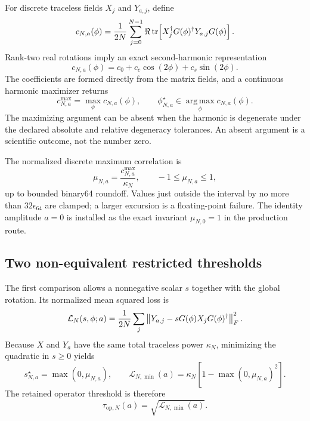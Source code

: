For discrete traceless fields $X_j$ and $Y_{a,j}$, define
\begin{equation}
 c_{N,a}(\phi)
 =\frac{1}{2N}\sum_{j=0}^{N-1}
 \Re\operatorname{tr}\!\left[X_j^\dagger G(\phi)^\dagger
                  Y_{a,j}G(\phi)\right].
 \label{eq:operator-correlation}
\end{equation}
Rank-two real rotations imply an exact second-harmonic representation
\begin{equation}
 c_{N,a}(\phi)=c_0+c_c\cos(2\phi)+c_s\sin(2\phi).
 \label{eq:correlation-harmonic}
\end{equation}
The coefficients are formed directly from the matrix fields, and a continuous harmonic
maximizer returns
\begin{equation}
 c_{N,a}^{\max}=\max_\phi c_{N,a}(\phi),
 \qquad
 \phi_{N,a}^{\star}\in\operatorname*{arg\,max}_\phi c_{N,a}(\phi).
 \label{eq:harmonic-maximum}
\end{equation}
The maximizing argument can be absent when the harmonic is degenerate under the declared
absolute and relative degeneracy tolerances.  An absent argument is a scientific
outcome, not the number zero.

The normalized discrete maximum correlation is
\begin{equation}
 \mu_{N,a}=\frac{c_{N,a}^{\max}}{\kappa_N},
 \qquad -1\le\mu_{N,a}\le1,
 \label{eq:normalized-correlation}
\end{equation}
up to bounded binary64 roundoff.  Values just outside the interval by no more than
$32\epsilon_{64}$ are clamped; a larger excursion is a floating-point failure.  The
identity amplitude $a=0$ is installed as the exact invariant $\mu_{N,0}=1$ in the
production route.

\subsection{Two non-equivalent restricted thresholds}

The first comparison allows a nonnegative scalar $s$ together with the global rotation.
Its normalized mean squared loss is
\begin{equation}
 \mathcal L_N(s,\phi;a)
 =\frac{1}{2N}\sum_j
  \left\lVert Y_{a,j}-sG(\phi)X_jG(\phi)^\dagger\right\rVert_F^2.
 \label{eq:scaled-loss}
\end{equation}
Because $X$ and $Y_a$ have the same total traceless power $\kappa_N$, minimizing the
quadratic in $s\ge0$ yields
\begin{equation}
 s_{N,a}^{\star}=\max(0,\mu_{N,a}),
 \qquad
 \mathcal L_{N,\min}(a)
 =\kappa_N\left[1-\max(0,\mu_{N,a})^2\right].
 \label{eq:scaled-minimum-loss}
\end{equation}
The retained operator threshold is therefore
\begin{equation}
 \tau_{\mathrm{op},N}(a)
 =\sqrt{\mathcal L_{N,\min}(a)}.
 \label{eq:operator-threshold}
\end{equation}

